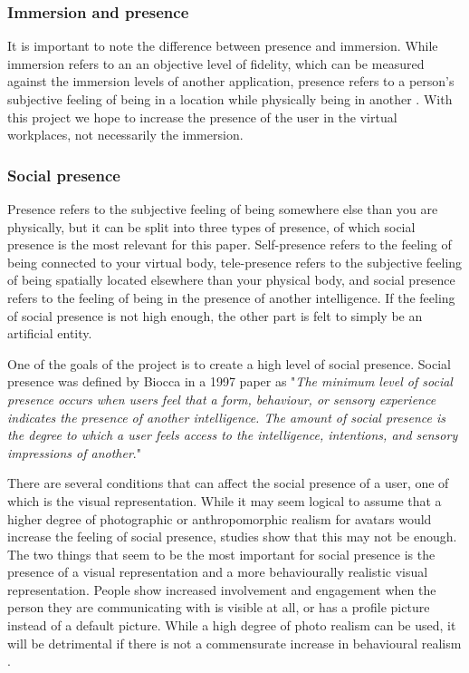   
\subsubsection{Immersion and presence} \label{immersionAndPresence}
It is important to note the difference between presence and immersion. While immersion refers to an an objective level of fidelity, which can be measured against the immersion levels of another application, presence refers to a person's subjective feeling of being in a location while physically being in another \cite{slater2003note}. With this project we hope to increase the presence of the user in the virtual workplaces, not necessarily the immersion.

\subsubsection{Social presence}
\label{section:socialPrecence}
Presence refers to the subjective feeling of being somewhere else than you are physically, but it can be split into three types of presence, of which social presence is the most relevant for this paper. Self-presence refers to the feeling of being connected to your virtual body, tele-presence refers to the subjective feeling of being spatially located elsewhere than your physical body, and social presence refers to the feeling of being in the presence of another intelligence. If the feeling of social presence is not high enough, the other part is felt to simply be an artificial entity.

One of the goals of the project is to create a high level of social presence. Social presence was defined by Biocca in a 1997 paper as "\textit{The minimum level of social presence occurs when users feel that a form, behaviour, or sensory experience indicates the presence of another intelligence. The amount of social presence is the degree to which a user feels access to the intelligence, intentions, and sensory impressions of another}\cite{biocca1997cyborg}."

There are several conditions that can affect the social presence of a user, one of which is the visual representation. While it may seem logical to assume that a higher degree of photographic or anthropomorphic realism for avatars would increase the feeling of social presence, studies show that this may not be enough. The two things that seem to be the most important for social presence is the presence of a visual representation and a more behaviourally realistic visual representation. People show increased involvement and engagement when the person they are communicating with is visible at all, or has a profile picture instead of a default picture. While a high degree of photo realism can be used, it will be detrimental if there is not a commensurate increase in behavioural realism \cite{oh2018systematic}.

